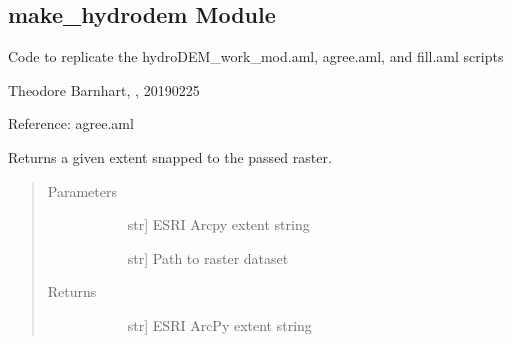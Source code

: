 \documentclass[letterpaper,10pt,english]{sphinxmanual}
\begin{document}
\subsection{make\_hydrodem Module}
\label{\detokenize{make_hydrodem:module-make_hydrodem}}\label{\detokenize{make_hydrodem:make-hydrodem-module}}\label{\detokenize{make_hydrodem::doc}}
Code to replicate the hydroDEM\_work\_mod.aml, agree.aml, and fill.aml scripts

Theodore Barnhart, , 20190225

Reference: agree.aml

\begin{fulllineitems}
\label{\detokenize{make_hydrodem:make_hydrodem.SnapExtent}}
Returns a given extent snapped to the passed raster.
\begin{quote}\begin{description}
\item[{Parameters}] \leavevmode\begin{description}
\item[{}] \leavevmode{[}str{]}
ESRI Arcpy extent string

\item[{}] \leavevmode{[}str{]}
Path to raster dataset

\end{description}

\item[{Returns}] \leavevmode\begin{description}
\item[{}] \leavevmode{[}str{]}
ESRI ArcPy extent string

\end{description}

\end{description}\end{quote}

\end{fulllineitems}

\end{document}
